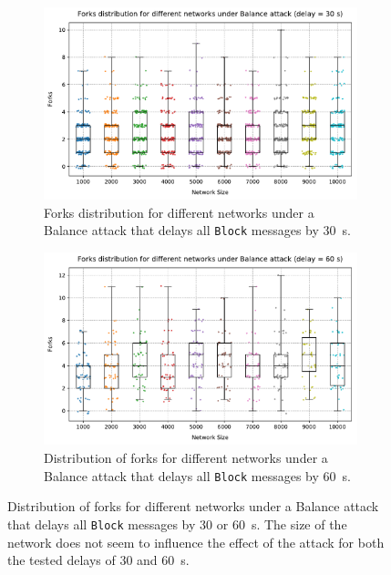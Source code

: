 \begin{figure}[h]
	\begin{subfigure}{\textwidth}
		\centering
		\includegraphics[width=\myplotswitdth \columnwidth]{plots/forks_attack_delay_30_network_sizes_boxplot}
		\vspace*{0.25cm}
		\caption{Forks distribution for different networks under a Balance attack that delays all \texttt{Block} messages by \SI{30}{\second}.}
		\vspace*{0.75cm}
	\end{subfigure}
	\begin{subfigure}{\textwidth}
		\centering
		\vspace*{0.25cm}
		\includegraphics[width=\myplotswitdth \columnwidth]{plots/forks_attack_delay_60_network_sizes_boxplot}
		\vspace*{0.25cm}
		\caption{Distribution of forks for different networks under a Balance attack that delays all \texttt{Block} messages by \SI{60}{\second}.}
		\vspace*{0.25cm}
	\end{subfigure}
	\caption[Forks distribution for different networks under Balance attack]{
		Distribution of forks for different networks under a Balance attack that delays all \texttt{Block} messages by \num{30} or \SI{60}{\second}.
		The size of the network does not seem to influence the effect of the attack for both the tested delays of \num{30} and \SI{60}{\second}.
	}
	\label{fig:forks-attack-sizes}
\end{figure}

